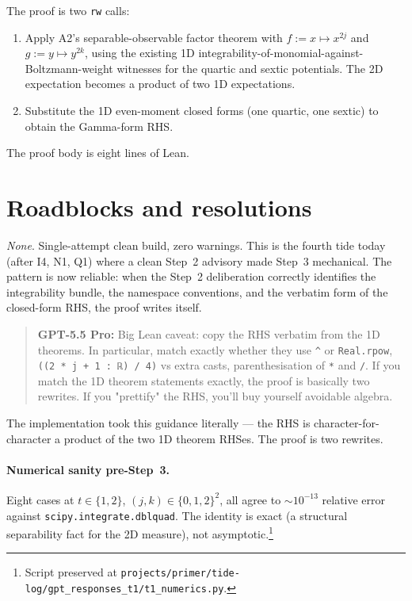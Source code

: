 \documentclass[11pt]{article}
\newcommand{\gptbox}[1]{\par\medskip\begin{quote}\small\textbf{\textcolor{green!50!black}{GPT-5.5 Pro:}} #1\end{quote}\medskip}
\begin{document}
The proof is two \texttt{rw} calls:

\begin{enumerate}[leftmargin=1em,itemsep=0.2em]
\item Apply A2's separable-observable factor theorem with
  $f := x \mapsto x^{2j}$ and $g := y \mapsto y^{2k}$, using the
  existing 1D integrability-of-monomial-against-Boltzmann-weight
  witnesses for the quartic and sextic potentials. The 2D
  expectation becomes a product of two 1D expectations.
\item Substitute the 1D even-moment closed forms (one quartic, one
  sextic) to obtain the Gamma-form RHS.
\end{enumerate}

\noindent The proof body is eight lines of Lean.

\section{Roadblocks and resolutions}

\emph{None}. Single-attempt clean build, zero warnings. This is the
fourth tide today (after I4, N1, Q1) where a clean Step~2 advisory
made Step~3 mechanical. The pattern is now reliable: when the Step~2
deliberation correctly identifies the integrability bundle, the
namespace conventions, and the verbatim form of the closed-form
RHS, the proof writes itself.

\gptbox{Big Lean caveat: copy the RHS verbatim from the 1D theorems.
In particular, match exactly whether they use \texttt{\^{}} or
\texttt{Real.rpow}, \texttt{((2 * j + 1 : ℝ) / 4)} vs extra casts,
parenthesisation of \texttt{*} and \texttt{/}. If you match the 1D
theorem statements exactly, the proof is basically two rewrites. If
you "prettify" the RHS, you'll buy yourself avoidable algebra.}

\noindent The implementation took this guidance literally — the RHS
is character-for-character a product of the two 1D theorem RHSes.
The proof is two rewrites.

\paragraph{Numerical sanity pre-Step~3.} Eight cases at
$t \in \{1, 2\}$, $(j, k) \in \{0, 1, 2\}^2$, all agree to
${\sim}10^{-13}$ relative error against \texttt{scipy.integrate.dblquad}.
The identity is exact (a structural separability fact for the 2D
measure), not asymptotic.\footnote{Script preserved at
\texttt{projects/primer/tide-log/gpt\_responses\_t1/t1\_numerics.py}.}
\end{document}

